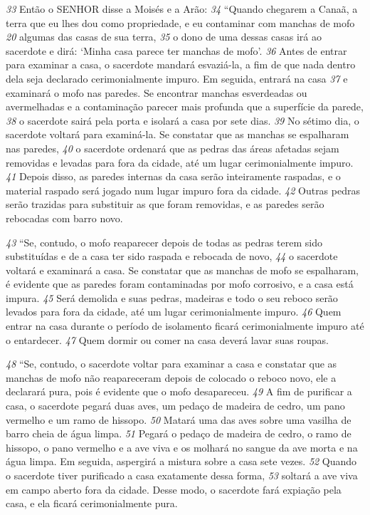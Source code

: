 \bigskip
\textit{\tiny 33}
Então o SENHOR disse a Moisés e a Arão: 
\textit{\tiny 34}
“Quando chegarem a Canaã, a terra
que eu lhes dou como propriedade, e eu contaminar com manchas de mofo
\textit{\tiny 20}
algumas das casas de sua terra, 
\textit{\tiny 35}
o dono de uma dessas casas irá ao sacerdote e
dirá: ‘Minha casa parece ter manchas de mofo’. 
\textit{\tiny 36}
Antes de entrar para examinar a
casa, o sacerdote mandará esvaziá-la, a fim de que nada dentro dela seja
declarado cerimonialmente impuro. Em seguida, entrará na casa 
\textit{\tiny 37}
e examinará o
mofo nas paredes. Se encontrar manchas esverdeadas ou avermelhadas e a
contaminação parecer mais profunda que a superfície da parede, 
\textit{\tiny 38}
o sacerdote
sairá pela porta e isolará a casa por sete dias. 
\textit{\tiny 39}
No sétimo dia, o sacerdote voltará
para examiná-la. Se constatar que as manchas se espalharam nas paredes, 
\textit{\tiny 40}
o
sacerdote ordenará que as pedras das áreas afetadas sejam removidas e levadas
para fora da cidade, até um lugar cerimonialmente impuro. 
\textit{\tiny 41}
Depois disso, as
paredes internas da casa serão inteiramente raspadas, e o material raspado será
jogado num lugar impuro fora da cidade. 
\textit{\tiny 42}
Outras pedras serão trazidas para
substituir as que foram removidas, e as paredes serão rebocadas com barro novo.

\smallskip
\textit{\tiny 43}
“Se, contudo, o mofo reaparecer depois de todas as pedras terem sido
substituídas e de a casa ter sido raspada e rebocada de novo, 
\textit{\tiny 44}
o sacerdote voltará
e examinará a casa. Se constatar que as manchas de mofo se espalharam, é
evidente que as paredes foram contaminadas por mofo corrosivo, e a casa está
impura. 
\textit{\tiny 45}
Será demolida e suas pedras, madeiras e todo o seu reboco serão
levados para fora da cidade, até um lugar cerimonialmente impuro. 
\textit{\tiny 46}
Quem
entrar na casa durante o período de isolamento ficará cerimonialmente impuro
até o entardecer. 
\textit{\tiny 47}
Quem dormir ou comer na casa deverá lavar suas roupas.

\smallskip
\textit{\tiny 48}
“Se, contudo, o sacerdote voltar para examinar a casa e constatar que as
manchas de mofo não reapareceram depois de colocado o reboco novo, ele a
declarará pura, pois é evidente que o mofo desapareceu. 
\textit{\tiny 49}
A fim de purificar a
casa, o sacerdote pegará duas aves, um pedaço de madeira de cedro, um pano
vermelho e um ramo de hissopo. 
\textit{\tiny 50}
Matará uma das aves sobre uma vasilha de
barro cheia de água limpa. 
\textit{\tiny 51}
Pegará o pedaço de madeira de cedro, o ramo de
hissopo, o pano vermelho e a ave viva e os molhará no sangue da ave morta e na
água limpa. Em seguida, aspergirá a mistura sobre a casa sete vezes. 
\textit{\tiny 52}
Quando o
sacerdote tiver purificado a casa exatamente dessa forma, 
\textit{\tiny 53}
soltará a ave viva em
campo aberto fora da cidade. Desse modo, o sacerdote fará expiação pela casa, e
ela ficará cerimonialmente pura.

